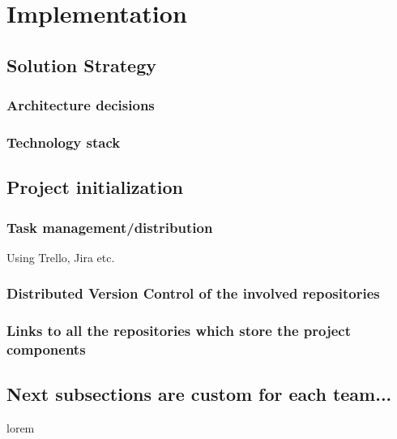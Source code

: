\section{Implementation}

\subsection{Solution Strategy}
\subsubsection{Architecture decisions}
\subsubsection{Technology stack}


\subsection{Project initialization}
\subsubsection{Task management/distribution}
\par Using Trello, Jira etc.
\subsubsection{Distributed Version Control of the involved repositories}
\subsubsection{Links to all the repositories which store the project components}

\subsection{Next subsections are custom for each team...}
\par lorem

\clearpage